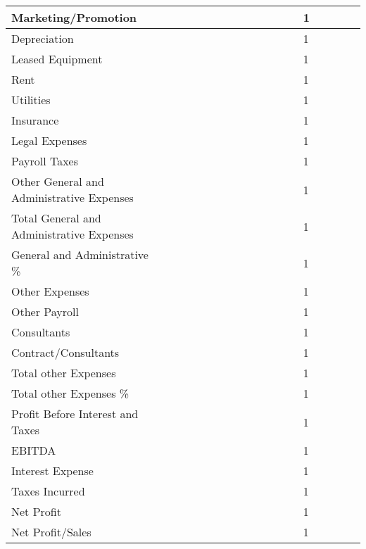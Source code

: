\documentclass[11pt]{article}
\begin{document}
\begin{landscape}
\begin{scriptsize}
\begin{tabular}{ | l | l | l | l | l | l | l | l | l | l | l | l | l | l | l | l | l | l |}
  Marketing/Promotion & & & & & & & & & & & & & 1 \\ \hline
  Depreciation & & & & & & & & & & & & & 1 \\ \hline
  Leased Equipment & & & & & & & & & & & & & 1 \\ \hline
  Rent & & & & & & & & & & & & & 1 \\ \hline
  Utilities & & & & & & & & & & & & & 1 \\ \hline
  Insurance & & & & & & & & & & & & & 1 \\ \hline
  Legal Expenses & & & & & & & & & & & & & 1 \\ \hline
  Payroll Taxes & & & & & & & & & & & & & 1 \\ \hline
  Other General and Administrative Expenses & & & & & & & & & & & & & 1 \\ \hline
  Total General and Administrative Expenses & & & & & & & & & & & & & 1 \\ \hline
  General and Administrative \% & & & & & & & & & & & & & 1 \\ \hline
  Other Expenses & & & & & & & & & & & & & 1 \\ \hline
  Other Payroll & & & & & & & & & & & & & 1 \\ \hline
  Consultants & & & & & & & & & & & & & 1 \\ \hline
  Contract/Consultants & & & & & & & & & & & & & 1 \\ \hline
  Total other Expenses & & & & & & & & & & & & & 1 \\ \hline
  Total other Expenses \% & & & & & & & & & & & & & 1 \\ \hline
  Profit Before Interest and Taxes & & & & & & & & & & & & & 1 \\ \hline
  EBITDA & & & & & & & & & & & & & 1 \\ \hline
  Interest Expense & & & & & & & & & & & & & 1 \\ \hline
  Taxes Incurred & & & & & & & & & & & & & 1 \\ \hline
  Net Profit & & & & & & & & & & & & & 1 \\ \hline
  Net Profit/Sales & & & & & & & & & & & & & 1 \\ \hline
\end{tabular}
\end{scriptsize}
\end{landscape}
\newpage
\thispagestyle{empty}
\end{document}

